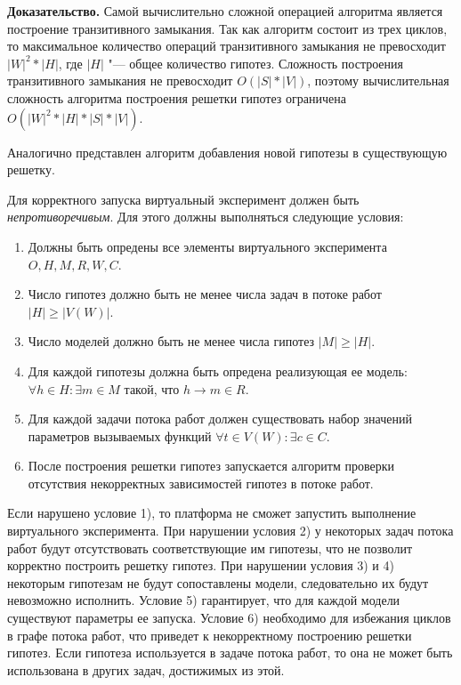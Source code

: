 \textbf{Доказательство.} Самой вычислительно сложной операцией алгоритма является построение транзитивного замыкания. 
Так как алгоритм состоит из трех циклов, то максимальное количество операций транзитивного замыкания не превосходит 
$|W|^2*|H|$, где $|H|$ "--- общее количество гипотез. Сложность построения транзитивного замыкания не превосходит 
$O\left(|S|*|V|\right)$, поэтому вычислительная сложность алгоритма построения решетки гипотез ограничена 
$O\left(|W|^2*|H|*|S|*|V|\right)$.

Аналогично представлен алгоритм добавления новой гипотезы в существующую решетку.

Для корректного запуска виртуальный эксперимент должен быть \textit{непротиворечивым}. 
Для этого должны выполняться следующие условия:
\begin{enumerate}
    \item Должны быть опредены все элементы виртуального эксперимента $O, H, M, R, W, C$.
    \item Число гипотез должно быть не менее числа задач в потоке работ $|H| \geq |V(W)| $.
    \item Число моделей должно быть не менее числа гипотез $|M| \geq |H|$.
    \item Для каждой гипотезы должна быть опредена реализующая ее модель: $ \forall h \in H: \exists m \in M$ такой, 
            что $h \rightarrow m \in R$.
    
    \item Для каждой задачи потока работ должен существовать набор значений параметров вызываемых функций 
            $ \forall t \in V(W): \exists c \in C$.
    \item После построения решетки гипотез запускается алгоритм проверки отсутствия 
            некорректных зависимостей гипотез в потоке работ.
\end{enumerate}

Если нарушено условие 1), то платформа не сможет запустить выполнение виртуального эксперимента.
При нарушении условия 2) у некоторых задач потока работ будут отсутствовать соответствующие им гипотезы, что не 
позволит корректно построить решетку гипотез. При нарушении условия 3) и 4) некоторым гипотезам не будут 
сопоставлены модели, следовательно их будут невозможно исполнить. Условие 5) гарантирует, что для каждой модели 
существуют параметры ее запуска. Условие 6) необходимо для избежания циклов в графе потока работ, что приведет к 
некорректному построению решетки гипотез. Если гипотеза используется в задаче потока работ, то она не может быть 
использована в других задач, достижимых из этой. 

